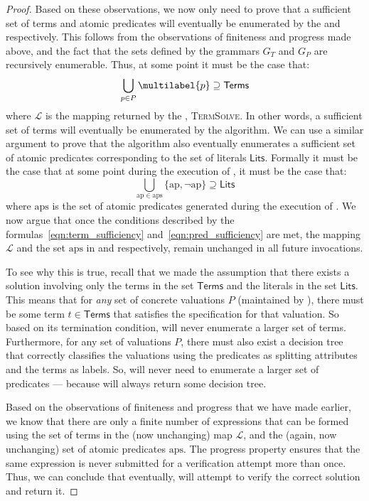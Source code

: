 \begin{proof}
Based on these observations, we now only need to prove that a
sufficient set of terms and atomic predicates will eventually be
enumerated by the  and 
respectively. This follows from the observations of finiteness and
progress made above, and the fact
that the sets defined by the grammars $G_T$  and $G_P$ are recursively
enumerable. Thus, at some point it must be the case that:
\begin{equation}
\bigcup_{p \in P}\multilabel{p} \supseteq \mathsf{Terms}
\label{eqn:term_sufficiency}
\end{equation}
where $\mathcal{L}$ is the mapping returned by the
, \textsc{TermSolve}. In other words, a
sufficient set of terms will eventually be enumerated by the
algorithm. We can use a similar argument to prove that the algorithm
also eventually enumerates a sufficient set of atomic predicates
corresponding to the set of literals $\mathsf{Lits}$.
Formally it must be the case that at some point during the execution
of , it must be the case that:
\begin{equation}
\bigcup_{\mathrm{ap} \in \mathrm{aps}}\{\mathrm{ap}, \neg\mathrm{ap}\}
\supseteq \mathsf{Lits}
\label{eqn:pred_sufficiency}
\end{equation}
where $\mathrm{aps}$ is the set of atomic predicates generated during
the execution of . We now argue that once the
conditions described by the formulas~\ref{eqn:term_sufficiency}
and~\ref{eqn:pred_sufficiency} are met, the mapping $\mathcal{L}$ and the
set $\mathrm{aps}$ in  and 
respectively, remain unchanged in all future invocations.

To see why this is true, recall that we made the assumption that there
exists a solution involving only the terms in the set $\mathsf{Terms}$
and the literals in the set $\mathsf{Lits}$. This means that for
\emph{any} set of concrete valuations $P$ (maintained by
), there must be some term $t \in \mathsf{Terms}$
that satisfies the specification for that valuation. So
based on its termination condition,  will never
enumerate a larger set of terms.
Furthermore, for any set of valuations $P$, there must also exist a
decision tree that correctly classifies the valuations using the
predicates as splitting attributes and the terms as labels. So,
 will never need to enumerate a larger set of
predicates --- because  will always
return some decision tree.

Based on the observations of finiteness and progress that we have made
earlier, we know that there are only a finite number of expressions
that can be formed using the set of terms in the (now unchanging) map
$\mathcal{L}$, and the (again, now unchanging) set of atomic
predicates $\mathrm{aps}$. The progress property ensures that the
same expression is never submitted for a verification attempt more
than once. Thus, we can conclude that eventually, 
will attempt to verify the correct solution and return it.
\end{proof}

